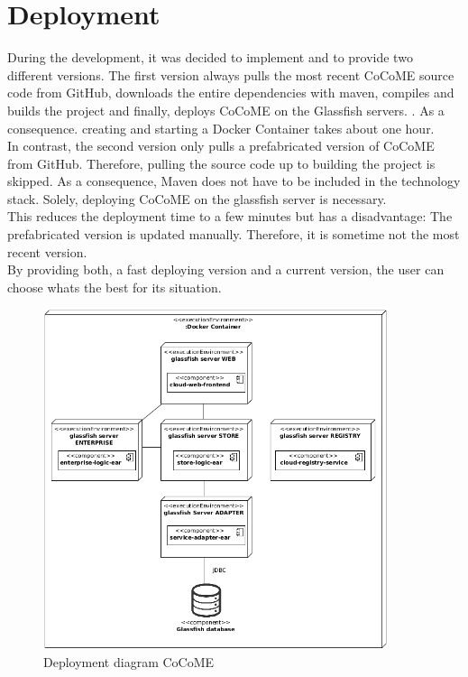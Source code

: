\documentclass[runningheads]{llncs}
\begin{document}
\section{Deployment}
	During the development, it was decided to implement and to provide two different versions. The first version always pulls the most recent CoCoME source code from GitHub, downloads the entire dependencies with maven, compiles and builds the project and finally, deploys CoCoME on the Glassfish servers. . As a consequence. creating and starting a Docker Container takes about one hour.\\
	In contrast, the second version only  pulls a prefabricated version of CoCoME from GitHub. Therefore, pulling the source code up to building the project is skipped. As a consequence, Maven does not have to be included in the technology stack. Solely, deploying CoCoME on the glassfish server is necessary.\\
	This reduces the deployment time to a few minutes but has a disadvantage: The prefabricated version is updated manually. Therefore, it is sometime not the most recent version.\\
	By providing both, a fast deploying version and a current version, the user can choose whats the best for its situation.
\begin{figure}[H]
	\centering
	\includegraphics[width = 0.9\textwidth]{img/docker_Container_Deployment.png}
	\caption{Deployment diagram CoCoME}
	\label{Deploym_CoCoME}
\end{figure}
\end{document}
